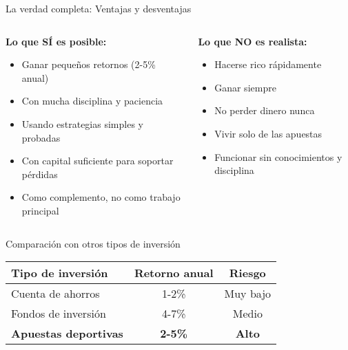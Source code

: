 \documentclass[aspectratio=169]{beamer}
\begin{document}
\begin{frame}{La verdad completa: Ventajas y desventajas}
\begin{columns}
\begin{column}{0.5\textwidth}
\textbf{\textcolor{verdeganancia}{Lo que SÍ es posible:}}
\begin{itemize}
\item Ganar pequeños retornos (2-5\% anual)
\item Con mucha disciplina y paciencia
\item Usando estrategias simples y probadas
\item Con capital suficiente para soportar pérdidas
\item Como complemento, no como trabajo principal
\end{itemize}
\end{column}

\begin{column}{0.5\textwidth}
\textbf{\textcolor{rojoperdida}{Lo que NO es realista:}}
\begin{itemize}
\item Hacerse rico rápidamente
\item Ganar siempre
\item No perder dinero nunca
\item Vivir solo de las apuestas
\item Funcionar sin conocimientos y disciplina
\end{itemize}
\end{column}
\end{columns}

\vspace{0.5cm}
\begin{alertblock}{Comparación con otros tipos de inversión}
\begin{center}
\begin{tabular}{lcc}
\textbf{Tipo de inversión} & \textbf{Retorno anual} & \textbf{Riesgo} \\
\midrule
Cuenta de ahorros & 1-2\% & Muy bajo \\
Fondos de inversión & 4-7\% & Medio \\
\textcolor{azulprincipal}{\textbf{Apuestas deportivas}} & \textcolor{azulprincipal}{\textbf{2-5\%}} & \textcolor{azulprincipal}{\textbf{Alto}} \\
\end{tabular}
\end{center}
\end{alertblock}
\end{frame}
\end{document}
